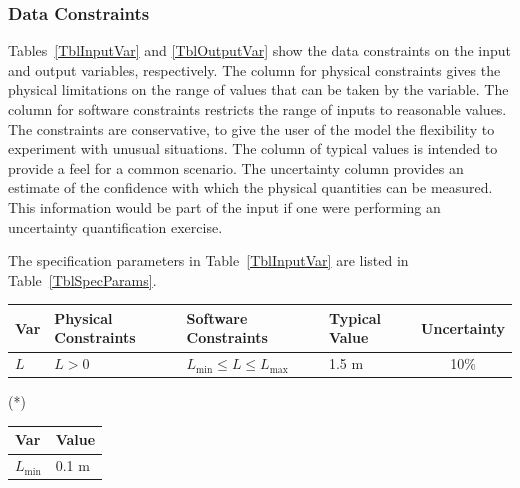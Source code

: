\documentclass[12pt]{article}
\begin{document}
\subsubsection{Data Constraints} \label{sec_DataConstraints}    

Tables~\ref{TblInputVar} and \ref{TblOutputVar} show the data constraints on the
input and output variables, respectively.  The column for physical constraints gives
the physical limitations on the range of values that can be taken by the
variable.  The column for software constraints restricts the range of inputs to
reasonable values.  The constraints are conservative, to give the user of the
model the flexibility to experiment with unusual situations.  The column of
typical values is intended to provide a feel for a common scenario.  The
uncertainty column provides an estimate of the confidence with which the
physical quantities can be measured.  This information would be part of the
input if one were performing an uncertainty quantification exercise.

The specification parameters in Table~\ref{TblInputVar} are listed in
Table~\ref{TblSpecParams}.

\begin{table}[!h]
  \caption{Input Variables} \label{TblInputVar}
  \renewcommand{\arraystretch}{1.2}
\noindent \begin{longtable*}{l l l l c} 
  \toprule
  \textbf{Var} & \textbf{Physical Constraints} & \textbf{Software Constraints} &
                             \textbf{Typical Value} & \textbf{Uncertainty}\\
  \midrule 
  $L$ & $L > 0$ & $L_{\text{min}} \leq L \leq L_{\text{max}}$ & 1.5 \si[per-mode=symbol] {\metre} & 10\%
  \\
  \bottomrule
\end{longtable*}
\end{table}

\noindent 
\begin{description}
\item[(*)] 
\end{description}

\begin{table}[!h]
\caption{Specification Parameter Values} \label{TblSpecParams}
\renewcommand{\arraystretch}{1.2}
\noindent \begin{longtable*}{l l} 
  \toprule
  \textbf{Var} & \textbf{Value} \\
  \midrule 
  $L_\text{min}$ & 0.1 \si{\metre}\\
  \bottomrule
\end{longtable*}
\end{table}
\end{document}
